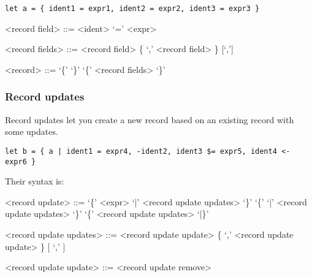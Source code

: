 \begin{verbatim}
let a = { ident1 = expr1, ident2 = expr2, ident3 = expr3 }
\end{verbatim}

\begin{grammar}
<record field>  ::= <ident> `=' <expr>

<record fields> ::= <record field> \{ `,' <record field> \} [`,']

<record> ::= `\{' `\}'
        \alt `\{' <record fields> `\}'
\end{grammar}


\subsubsection{Record updates}
Record updates let you create a new record based on an existing record with some updates.

\begin{verbatim}
let b = { a | ident1 = expr4, -ident2, ident3 $= expr5, ident4 <- expr6 }
\end{verbatim}

Their syntax is:
\begin{grammar}
<record update> ::= `\{' <expr> `|' <record update updates> `\}'
               \alt `\{' `|' <record update updates> `\}'
               \alt `\{' <record update updates> `|\}'

<record update updates> ::= <record update update> \{ `,' <record update update> \} [ `,' ]

<record update update> ::= <record update remove>
\end{grammar}

